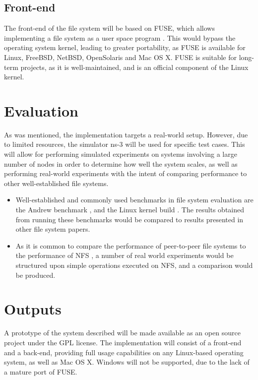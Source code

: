 \documentclass[8pt,a4paper]{article}
\begin{document}
\subsection{Front-end}

The front-end of the file system will be based on FUSE, which allows implementing a file system as a user space program \cite{fuse}. This would bypass the operating system kernel, leading to greater portability, as FUSE is available for Linux, FreeBSD, NetBSD, OpenSolaris and Mac OS X. FUSE is suitable for long-term projects, as it is well-maintained, and is an official component of the Linux kernel.

\section{Evaluation}

As was mentioned, the implementation targets a real-world setup. However, due to limited resources, the simulator ns-3 \cite{ns3} will be used for specific test cases. This will allow for performing simulated experiments on systems involving a large number of nodes in order to determine how well the system scales, as well as performing real-world experiments with the intent of comparing performance to other well-established file systems.

\begin{itemize}
\item Well-established and commonly used benchmarks in file system evaluation are the Andrew benchmark \cite{andrew}, and the Linux kernel build \cite{kernelb}. The results obtained from running these benchmarks would be compared to results presented in other file system papers.

\item As it is common to compare the performance of peer-to-peer file systems to the performance of NFS \cite{oceanstore} \cite{ivy} \cite{pastis}, a number of real world experiments would be structured upon simple operations executed on NFS, and a comparison would be produced.
\end{itemize}

\section{Outputs}

A prototype of the system described will be made available as an open source project under the GPL \cite{gpl} license. The implementation will consist of a front-end and a back-end, providing full usage capabilities on any Linux-based operating system, as well as Mac OS X. Windows will not be supported, due to the lack of a mature port of FUSE. 
\end{document}

